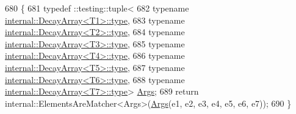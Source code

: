 \begin{DoxyCode}
680                                               \{
681   typedef ::testing::tuple<
682       \textcolor{keyword}{typename} \hyperlink{namespaceupload_a4fc56f0dd6613be15c3c4dc3af3619ce}{internal::DecayArray<T1>::type},
683       \textcolor{keyword}{typename} \hyperlink{namespaceupload_a4fc56f0dd6613be15c3c4dc3af3619ce}{internal::DecayArray<T2>::type},
684       \textcolor{keyword}{typename} \hyperlink{namespaceupload_a4fc56f0dd6613be15c3c4dc3af3619ce}{internal::DecayArray<T3>::type},
685       \textcolor{keyword}{typename} \hyperlink{namespaceupload_a4fc56f0dd6613be15c3c4dc3af3619ce}{internal::DecayArray<T4>::type},
686       \textcolor{keyword}{typename} \hyperlink{namespaceupload_a4fc56f0dd6613be15c3c4dc3af3619ce}{internal::DecayArray<T5>::type},
687       \textcolor{keyword}{typename} \hyperlink{namespaceupload_a4fc56f0dd6613be15c3c4dc3af3619ce}{internal::DecayArray<T6>::type},
688       \textcolor{keyword}{typename} \hyperlink{namespaceupload_a4fc56f0dd6613be15c3c4dc3af3619ce}{internal::DecayArray<T7>::type}> 
      \hyperlink{namespacetesting_a09ac462e8d6ed468cbfaa9c767aee0aa}{Args};
689   \textcolor{keywordflow}{return} internal::ElementsAreMatcher<Args>(\hyperlink{namespacetesting_a09ac462e8d6ed468cbfaa9c767aee0aa}{Args}(e1, e2, e3, e4, e5, e6, e7));
690 \}
\end{DoxyCode}
